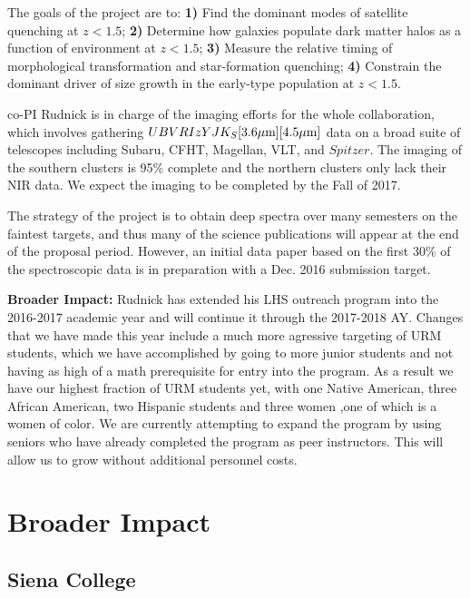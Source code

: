 \documentclass[11pt, preprint]{aastex}
\begin{document}
{The goals of the project are to: \textbf{1)} Find the dominant modes
of satellite quenching at $z<1.5$; \textbf{2)} Determine how galaxies
populate dark matter halos as a function of environment at $z<1.5$;
\textbf{3)} Measure the relative timing of morphological
transformation and star-formation quenching; \textbf{4)} Constrain the
dominant driver of size growth in the early-type population at
\boldmath$z<1.5$.  

co-PI Rudnick is in charge of the imaging efforts for the whole
collaboration, which involves gathering
$UBVRIzYJK_S[3.6\mbox{$\mu$m}][4.5\mbox{$\mu$m}]$ data on a broad suite of
telescopes including Subaru, CFHT, Magellan, VLT, and $Spitzer$.  The
imaging of the southern clusters is 95\% complete and the northern
clusters only lack their NIR data.  We expect the imaging to be
completed by the Fall of 2017.

The strategy of the project is to obtain deep spectra over many
semesters on the faintest targets, and thus many of the science
publications will appear at the end of the proposal period.  However,
an initial data paper based on the first 30\% of the spectroscopic
data is in preparation with a Dec. 2016 submission target.

\textbf{Broader Impact:} Rudnick has extended his LHS outreach program
into the 2016-2017 academic year and will continue it through the
2017-2018 AY.  Changes that we have made this year include a much more
agressive targeting of URM students, which we have accomplished by
going to more junior students and not having as high of a math
prerequisite for entry into the program.  As a result we have our
highest fraction of URM students yet, with one Native American, three
African American, two Hispanic students and three women ,one of which
is a women of color.  We are currently attempting to expand the
program by using seniors who have already completed the program as
peer instructors.  This will allow us to grow without additional
personnel costs.

\vspace*{-.7cm}
\section{Broader Impact}

\vspace*{-.4cm}
\subsection{Siena College}
\vspace*{-.4cm}

}
\end{document}
